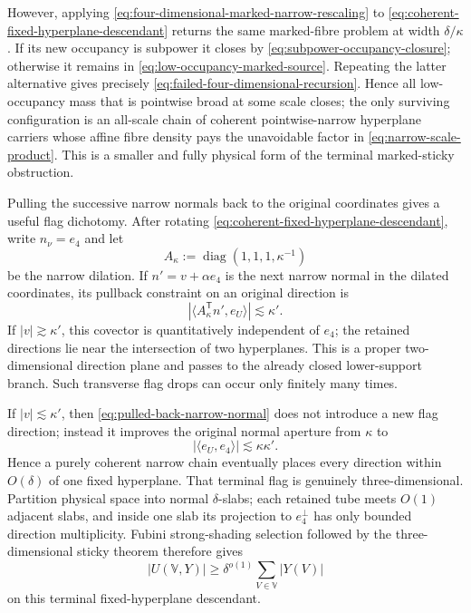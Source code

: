 \documentclass[11pt]{article}
\begin{document}
However, applying
\eqref{eq:four-dimensional-marked-narrow-rescaling} to
\eqref{eq:coherent-fixed-hyperplane-descendant} returns the same
marked-fibre problem at width \(\delta/\kappa\).  If its new occupancy
is subpower it closes by \eqref{eq:subpower-occupancy-closure}; otherwise it
remains in \eqref{eq:low-occupancy-marked-source}.  Repeating the latter
alternative gives precisely
\eqref{eq:failed-four-dimensional-recursion}.  Hence all low-occupancy
mass that is pointwise broad at some scale closes; the only surviving
configuration is an all-scale chain of coherent pointwise-narrow hyperplane
carriers whose affine fibre density pays the unavoidable factor in
\eqref{eq:narrow-scale-product}.  This is a smaller and fully physical
form of the terminal marked-sticky obstruction.

Pulling the successive narrow normals back to the original coordinates gives
a useful flag dichotomy.  After rotating
\eqref{eq:coherent-fixed-hyperplane-descendant}, write
\(n_\nu=e_4\) and let
\[
 A_\kappa:=\operatorname{diag}(1,1,1,\kappa^{-1})
\]
be the narrow dilation.  If \(n'=v+\alpha e_4\) is the next narrow
normal in the dilated coordinates, its pullback constraint on an original
direction is
\begin{equation}\label{eq:pulled-back-narrow-normal}
 |\langle A_\kappa^{\mathsf T}n',e_U\rangle|
 \lesssim\kappa'.
\end{equation}
If \(|v|\gtrsim\kappa'\), this covector is quantitatively independent
of \(e_4\); the retained directions lie near the intersection of two
hyperplanes.  This is a proper two-dimensional direction plane and passes to
the already closed lower-support branch.  Such transverse flag drops can
occur only finitely many times.

If \(|v|\lesssim\kappa'\), then
\eqref{eq:pulled-back-narrow-normal} does not introduce a new flag
direction; instead it improves the original normal aperture from
\(\kappa\) to
\begin{equation}\label{eq:coherent-normal-aperture-product}
 |\langle e_U,e_4\rangle|
 \lesssim\kappa\kappa'.
\end{equation}
Hence a purely coherent narrow chain eventually places every direction within
\(O(\delta)\) of one fixed hyperplane.  That terminal flag is genuinely
three-dimensional.  Partition physical space into normal
\(\delta\)-slabs; each retained tube meets \(O(1)\) adjacent slabs,
and inside one slab its projection to \(e_4^\perp\) has only bounded
direction multiplicity.  Fubini strong-shading selection followed by the
three-dimensional sticky theorem therefore gives
\begin{equation}\label{eq:terminal-fixed-hyperplane-closure}
 |U(\mathbb V,Y)|
 \ge\delta^{o(1)}\sum_{V\in\mathbb V}|Y(V)|
\end{equation}
on this terminal fixed-hyperplane descendant.
\end{document}
